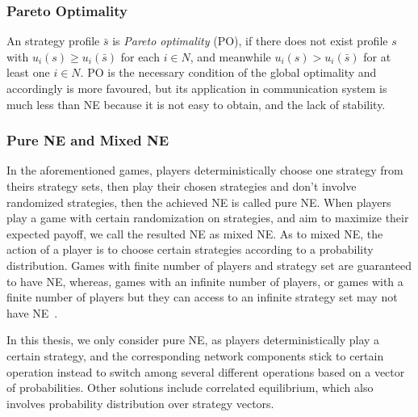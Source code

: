 


\subsubsection*{Pareto Optimality}
An strategy profile $\bar{s}$ is \textit{Pareto optimality} (\gls{PO}), if there does not exist profile $s$ with $u_i(s)\geq u_i(\bar{s})$ for each $i\in N$, and meanwhile $u_i(s)> u_i(\bar{s})$ for at least one $i\in N$.
PO is the necessary condition of the global optimality and accordingly is more favoured, but its application in communication system is much less than NE because it is not easy to obtain, and the lack of stability.


\subsubsection*{Pure NE and Mixed NE}
In the aforementioned games, players deterministically choose one strategy from theirs strategy sets, then play their chosen strategies and don't involve randomized strategies, then the achieved NE is called pure NE. 
When players play a game with certain randomization on strategies, and aim to maximize their expected payoff, we call the resulted NE as mixed NE.
As to mixed NE, the action of a player is to choose certain strategies according to a probability distribution.
Games with finite number of players and strategy set are guaranteed to have NE, whereas, games with an infinite number of players, or games with a finite number of players but they can access to an infinite strategy set may not have NE~\cite{agt_book}.

In this thesis, we only consider pure NE, as players deterministically play a certain strategy, and the corresponding network components stick to certain operation instead to switch among several different operations based on a vector of probabilities.
Other solutions include correlated equilibrium, which also involves probability distribution over strategy vectors.



